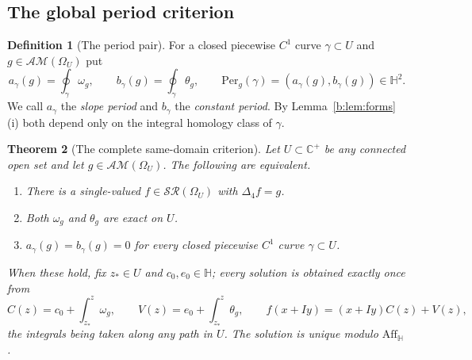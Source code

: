 \documentclass[11pt,a4paper]{article}
\numberwithin{equation}{section}
\newtheorem{theorem}{Theorem}[section]
\theoremstyle{definition}
\newtheorem{definition}[theorem]{Definition}
\theoremstyle{remark}
\theoremstyle{plain}
\newcommand{\HH}{\mathbb H}
\newcommand{\CC}{\mathbb C}
\newcommand{\Cplus}{\CC^{+}}
\newcommand{\lap}{\Delta_4}
\newcommand{\SR}{\mathcal{SR}}
\newcommand{\AM}{\mathcal{AM}}
\newcommand{\Om}{\Omega}
\newcommand{\Aff}{\mathrm{Aff}_{\HH}}
\newcommand{\om}{\omega}
\newcommand{\thet}{\theta}
\newcommand{\Per}{\mathrm{Per}}
\newcommand{\pot}{C}          %
\newcommand{\potV}{V}         %
\begin{document}
\subsection{The global period criterion}
\label{b:sub:criterion}

\begin{definition}[The period pair]
\label{b:def:periods}
For a closed piecewise $C^1$ curve $\gamma\subset U$ and $g\in\AM(\Om_U)$ put
\begin{equation}
 a_\gamma(g)=\oint_\gamma\om_g,\qquad
 b_\gamma(g)=\oint_\gamma\thet_g,\qquad
 \Per_g(\gamma)=(a_\gamma(g),b_\gamma(g))\in\HH^2 .
 \label{b:periods}
\end{equation}
We call $a_\gamma$ the \emph{slope period} and $b_\gamma$ the \emph{constant
period}.  By Lemma~\ref{b:lem:forms}(i) both depend only on the integral
homology class of $\gamma$.
\end{definition}

\begin{theorem}[The complete same-domain criterion]
\label{b:thm:period}
Let $U\subset\Cplus$ be \emph{any} connected open set and let
$g\in\AM(\Om_U)$.  The following are equivalent.
\begin{enumerate}[label=\textup{(\roman*)}]
\item There is a single-valued $f\in\SR(\Om_U)$ with $\lap f=g$.
\item Both $\om_g$ and $\thet_g$ are exact on $U$.
\item $a_\gamma(g)=b_\gamma(g)=0$ for every closed piecewise $C^1$ curve
$\gamma\subset U$.
\end{enumerate}
When these hold, fix $z_*\in U$ and $c_0,e_0\in\HH$; every solution is
obtained exactly once from
\begin{equation}
 \pot(z)=c_0+\int_{z_*}^{z}\om_g,\qquad
 \potV(z)=e_0+\int_{z_*}^{z}\thet_g,\qquad
 f(x+Iy)=(x+Iy)\pot(z)+\potV(z),
 \label{b:global-inverse}
\end{equation}
the integrals being taken along any path in $U$.  The solution is unique
modulo $\Aff$.
\end{theorem}
\end{document}

